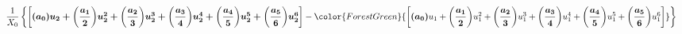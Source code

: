 \documentclass[a4paper,landscape]{article}
\begin{document}
\begin{align*}
{    }
    {
        \begin{array}{lll}
            \dfrac{1}{X_0}
            \left\{
                \left[
                    \boldsymbol
                    {
                        \boldsymbol{\left(a_0\right)}u_2
                        + \boldsymbol{\left(\dfrac{a_1}{2}\right)} u_2^2
                        + \boldsymbol{\left(\dfrac{a_2}{3}\right)} u_2^3
                        + \boldsymbol{\left(\dfrac{a_3}{4}\right)} u_2^4
                        + \boldsymbol{\left(\dfrac{a_4}{5}\right)} u_2^5
                        + \boldsymbol{\left(\dfrac{a_5}{6}\right)} u_2^6
                    }
                \right]
                -
                \color{ForestGreen}
                {
                    \left[
                        \boldsymbol{\left(a_0\right)}u_1
                        + \boldsymbol{\left(\dfrac{a_1}{2}\right)} u_1^2
                        + \boldsymbol{\left(\dfrac{a_2}{3}\right)} u_1^3
                        + \boldsymbol{\left(\dfrac{a_3}{4}\right)} u_1^4
                        + \boldsymbol{\left(\dfrac{a_4}{5}\right)} u_1^5
                        + \boldsymbol{\left(\dfrac{a_5}{6}\right)} u_1^6
                    \right]
                }
            \right\}
        \end{array}
    }
\end{align*}
\end{document}
